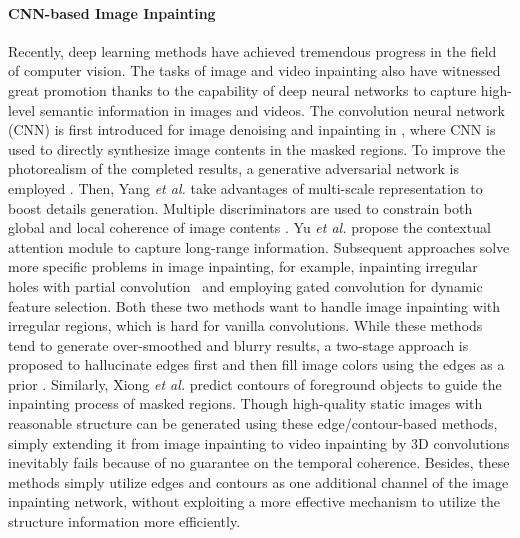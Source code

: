 \paragraph{CNN-based Image Inpainting}
Recently, deep learning methods have achieved tremendous progress in the field
of computer vision. The tasks of image and video inpainting also have witnessed great promotion thanks to the capability of deep neural networks to capture high-level semantic information in images and videos.
%
The convolution neural network (CNN) is first introduced for image denoising and inpainting in \cite{xie2012image}, where CNN is used to directly synthesize image contents in the masked regions.
To improve the photorealism of the completed results, a generative adversarial network is employed \cite{pathak2016context}. 
Then, Yang \emph{et al.} \cite{yang2017high} take advantages of multi-scale representation to boost details generation.
Multiple discriminators are used to constrain both global and local coherence of image contents \cite{iizuka2017globally}.  
Yu \emph{et al.} \cite{yu2018generative} propose the contextual attention module to capture long-range information.
Subsequent approaches solve more specific problems in image inpainting, for example, inpainting irregular holes with partial convolution~\cite{liu2018partialinpainting} and employing gated convolution \cite{yu2018free} for dynamic feature selection. Both these two methods want to handle image inpainting with irregular regions, which is hard for vanilla convolutions. 
%
While these methods tend to generate over-smoothed and blurry results, a two-stage approach is proposed to hallucinate edges first and then fill image colors using the edges as a prior \cite{nazeri2019edgeconnect}. Similarly, Xiong \emph{et al.} \cite{Xiong_2019_CVPR} predict contours of foreground objects to guide the inpainting process of masked regions.
Though high-quality static images with reasonable structure can be generated using these edge/contour-based methods, simply extending it from image inpainting to video inpainting by 3D convolutions inevitably fails because of no guarantee on the temporal coherence. Besides, these methods simply utilize edges and contours as one additional channel of the image inpainting network, without exploiting a more effective mechanism to utilize the structure information more efficiently. 


